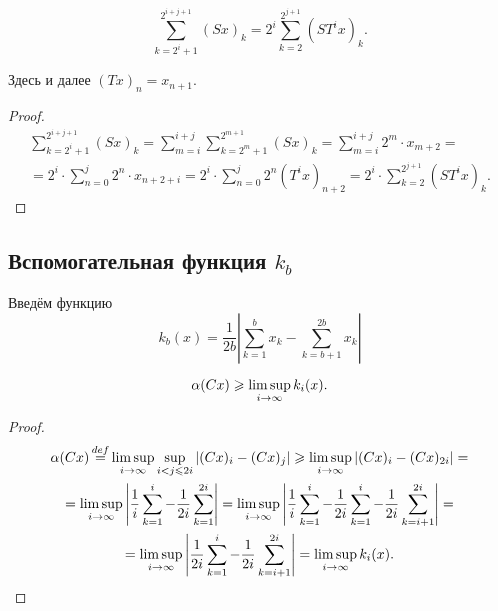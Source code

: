 \begin{lemma}
	\begin{equation}\label{summa_S}
		\sum_{k=2^i+1}^{2^{i+j+1}} (Sx)_k =
		2^i\sum_{k=2}^{2^{j+1}} (ST^ix)_k
		.
	\end{equation}

	Здесь и далее $(Tx)_n = x_{n+1}$.
\end{lemma}

\begin{proof}
	\begin{multline*}
		\sum_{k=2^i+1}^{2^{i+j+1}} (Sx)_k =
		\sum_{m = i}^{i+j}\sum_{k=2^m+1}^{2^{m+1}} (Sx)_k =
		\sum_{m = i}^{i+j}2^m \cdot x_{m+2} =
		\\=
		2^i \cdot \sum_{n = 0}^{j}2^n \cdot x_{n+2+i} =
		2^i \cdot \sum_{n = 0}^{j}2^n (T^i x)_{n+2} =
		2^i \cdot \sum_{k=2}^{2^{j+1}} (ST^i x)_k
		.
	\end{multline*}
\end{proof}

\subsection{Вспомогательная функция $k_b$}

Введём функцию
\begin{equation}\label{def_k_b}
	k_b(x) = \frac{1}{2b}\left|
		\sum_{k=1}^{b}x_k - \sum_{k=b+1}^{2b}x_k
	\right|
\end{equation}

\begin{lemma}
	\begin{equation}\label{alpha_greater_k_b}
		\alpha (Cx) \geq \varlimsup_{i\to \infty} k_i(x)
		.
	\end{equation}
\end{lemma}

\begin{proof}
	\begin{multline*}
		\alpha (Cx) \mathop{=}\limits^{def}
		\varlimsup_{i\to \infty} \sup_{i<j\leq 2i} |(Cx)_i - (Cx)_j| \geq
		\varlimsup_{i\to \infty} |(Cx)_i - (Cx)_{2i}| =
		\\ =
		\varlimsup_{i\to \infty} \left|\frac{1}{i}\sum_{k=1}^i  - \frac{1}{2i}\sum_{k=1}^{2i} \right| =
		\varlimsup_{i\to \infty} \left|\frac{1}{i}\sum_{k=1}^i  - \frac{1}{2i}\sum_{k=1}^{i}- \frac{1}{2i}\sum_{k=i+1}^{2i}\right| =
		\\=
		\varlimsup_{i\to \infty} \left|\frac{1}{2i}\sum_{k=1}^i - \frac{1}{2i}\sum_{k=i+1}^{2i}\right| =
		\varlimsup_{i\to \infty} k_i(x)
		.
	\end{multline*}
\end{proof}

